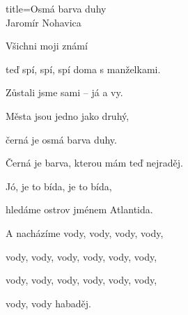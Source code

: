 \begin{song}{title=\centering Osmá barva duhy \\\normalsize Jaromír Nohavica  \vspace*{-0.3cm}}
{\begin{minipage}[t]{0.48\textwidth}
	Všichni moji známí
	
	teď spí, spí, spí doma s manželkami.

	Zůstali jsme sami -- já a vy.
	
	Města jsou jedno jako druhý,
	
	černá je osmá barva duhy.
	
	Černá je barva, kterou mám teď nejraděj.
	
	Jó, je to bída, je to bída,
	
	hledáme ostrov jménem Atlantida.
	
	A nacházíme vody, vody, vody, vody,
	
	vody, vody, vody, vody, vody, vody,
	
	vody, vody, vody, vody, vody, vody,

	vody, vody habaděj. 

\end{minipage}
}
\setcounter{Slokočet}{0}
\end{song}
